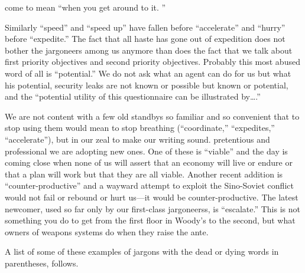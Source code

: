 \documentclass[
    oneside,
    11pt,
    draft
]{memoir}
\begin{document}
come to mean \enquote{when you get around to it. }

Similarly \enquote{speed} and \enquote{speed up} have fallen before \enquote{accelerate} and \enquote{hurry} before \enquote{expedite.} The fact that all haste has gone out of expedition does not bother the jargoneers among us anymore than does the fact that we talk about first  priority objectives and second priority objectives. Probably this most abused word of all is \enquote{potential.} We do not ask what an agent can do for us but what his potential, security leaks are not known or possible but known or potential, and the \enquote{potential utility of this questionnaire can be illustrated by\dots.} 

We are not content with a few old standbys so familiar and so convenient that to stop using them would mean to stop breathing (\enquote{coordinate,} \enquote{expedites,} \enquote{accelerate}), but in our zeal to make our writing sound. pretentious and professional we are adopting new ones. One of these is \enquote{viable} and the day is coming close when none of us will assert that an economy will live or endure or that a plan will work but that they are all viable. Another recent addition is \enquote{counter-productive} and a wayward attempt to exploit the Sino-Soviet conflict would not fail or rebound or hurt us---it would be counter-productive. The latest newcomer, used so far only by our first-class jargoneerss, is \enquote{escalate.} This is not something you do to get from the first floor in Woody's to the second, but what owners of weapons systems do when they raise the ante.

A list of some of these examples of jargons with the dead or dying words in parentheses, follows. 
\end{document}
